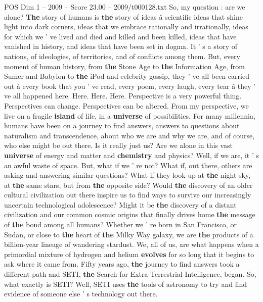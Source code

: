 \begin{textsample}{POS Dim 1 – 2009 – Score 23.00 – 2009/t000128.txt}  \label{ex:f1_pos_031}
So, my question : are we alone? \textbf{The} story of humans is \textbf{the} story of ideas â scientific ideas that shine light into dark corners, ideas that we embrace rationally and irrationally, ideas for which we ' ve lived and died and killed and been killed, ideas that have vanished in history, and ideas that have been set in dogma.
It ' s a story of nations, of ideologies, of territories, and of conflicts among them.
But, every moment of human history, from \textbf{the} Stone Age to \textbf{the} Information Age, from Sumer and Babylon to \textbf{the} iPod and celebrity gossip, they ' ve all been carried out â every book that you ' ve read, every poem, every laugh, every tear â they ' ve all happened here.
Here.
Here.
Here.
Perspective is a very powerful thing.
Perspectives can change.
Perspectives can be altered.
From my perspective, we live on a fragile \textbf{island} of life, in a \textbf{universe} of possibilities.
For many millennia, humans have been on a journey to find answers, answers to questions about naturalism and transcendence, about who we are and why we are, and of course, who else might be out there.
Is it really just us?
Are we alone in this vast \textbf{universe} of energy and matter and \textbf{chemistry} and physics?
Well, if we are, it ' s an awful waste of space.
But, what if we ' re not?
What if, out there, others are asking and answering similar questions?
What if they look up at \textbf{the} night sky, at \textbf{the} same stars, but from \textbf{the} opposite side?
Would \textbf{the} discovery of an older cultural civilization out there inspire us to find ways to survive our increasingly uncertain technological adolescence?
Might it be \textbf{the} discovery of a distant civilization and our common cosmic origins that finally drives home \textbf{the} message of \textbf{the} bond among all humans?
Whether we ' re born in San Francisco, or Sudan, or close to \textbf{the} heart of \textbf{the} Milky Way galaxy, we are \textbf{the} products of a billion-year lineage of wandering stardust.
We, all of us, are what happens when a primordial mixture of hydrogen and helium \textbf{evolves} for so long that it begins to ask where it came from.
Fifty years ago, \textbf{the} journey to find answers took a different path and SETI, \textbf{the} Search for Extra-Terrestrial Intelligence, began.
So, what exactly is SETI?
Well, SETI uses \textbf{the} tools of astronomy to try and find evidence of someone else ' s technology out there.

\end{textsample}
